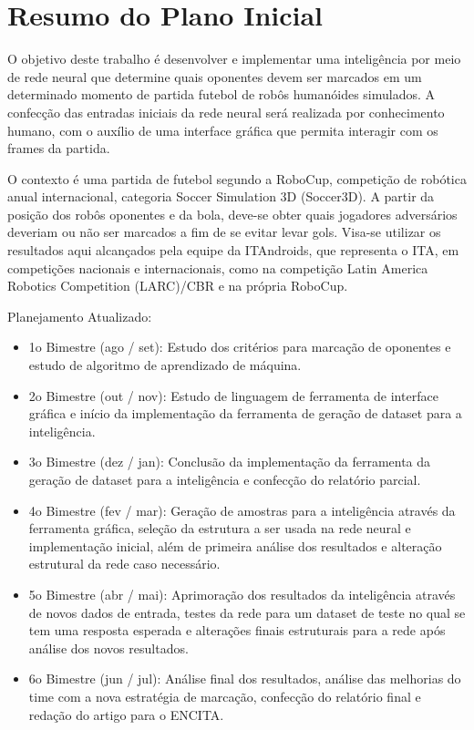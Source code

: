 \documentclass[a4paper,12pt]{article}
\begin{document}




\tableofcontents

\newpage

\section{Resumo do Plano Inicial}
\label{secao:plano_inicial}

O objetivo deste trabalho é desenvolver e implementar uma inteligência por meio de rede neural que determine quais oponentes devem ser marcados em um determinado momento de partida futebol de robôs humanóides simulados. A confecção das entradas iniciais da rede neural será realizada por conhecimento humano, com o auxílio de uma interface gráfica que permita interagir com os frames da partida. 

O contexto é uma partida de futebol segundo a RoboCup, competição de robótica anual internacional, categoria Soccer Simulation 3D (Soccer3D). A partir da posição dos robôs oponentes e da bola, deve-se obter quais jogadores adversários deveriam ou não ser marcados a fim de se evitar levar gols. Visa-se utilizar os resultados aqui alcançados pela equipe da ITAndroids, que representa o ITA, em competições nacionais e internacionais, como na competição Latin America Robotics Competition (LARC)/CBR e na própria RoboCup.

Planejamento Atualizado:
\begin{itemize}

\item 1o Bimestre (ago / set): Estudo dos critérios para marcação de oponentes e estudo de algoritmo de aprendizado de máquina.

\item 2o Bimestre (out / nov): Estudo de linguagem de ferramenta de interface gráfica e início da implementação da ferramenta de geração de dataset para a inteligência.

\item 3o Bimestre (dez / jan): Conclusão da implementação da ferramenta da geração de dataset para a inteligência e confecção do relatório parcial.

\item 4o Bimestre (fev / mar): Geração de amostras para a inteligência através da ferramenta gráfica, seleção da estrutura a ser usada na rede neural e implementação inicial, além de primeira análise dos resultados e alteração estrutural da rede caso necessário.

\item 5o Bimestre (abr / mai): Aprimoração dos resultados da inteligência através de novos dados de entrada, testes da rede para um dataset de teste no qual se tem uma resposta esperada e alterações finais estruturais para a rede após análise dos novos resultados.

\item 6o Bimestre (jun / jul): Análise final dos resultados, análise das melhorias do time com a nova estratégia de marcação, confecção do relatório final e redação do artigo para o ENCITA.

\end{itemize}
\end{document}
